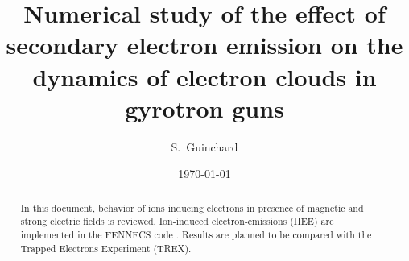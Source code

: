 \documentclass[aps,prc,floatfix,showkeys,nofootinbib]{revtex4-1}
\begin{document}
\title{Numerical study of the effect of secondary electron emission on the dynamics of electron clouds in gyrotron guns }

\author{S.~Guinchard} 


\date{\today}

\begin{abstract}
In this document, behavior of ions inducing electrons in presence of magnetic and strong electric fields is reviewed. Ion-induced electron-emissions (IIEE) are implemented in the FENNECS code \cite{fennecs}. Results are planned to be compared with the Trapped Electrons Experiment (TREX).
\end{abstract}

{
\let\clearpage\relax
\maketitle
\sloppy
}














\newpage


\end{document}
